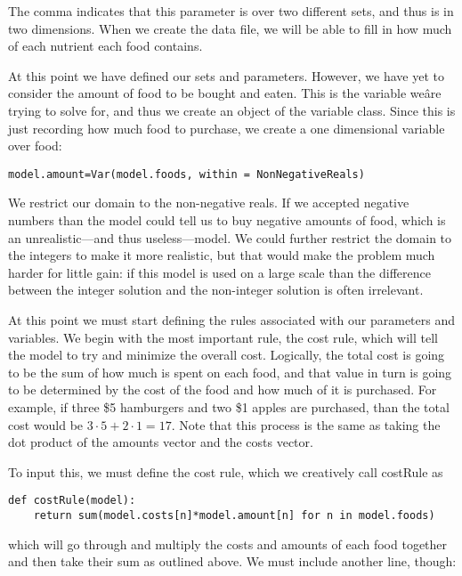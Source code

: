 \documentclass{article}
\begin{document}
The comma indicates that this parameter is over two different sets, and thus is in two dimensions.  When we create the data file, we will be able to fill in how much of each nutrient each food contains.

At this point we have defined our sets and parameters.  However, we have yet to consider the amount of food to be bought and eaten.  This is the variable weâre trying to solve for, and thus we create an object of the variable class.  Since this is just recording how much food to purchase, we create a one dimensional variable over food:

\begin{verbatim}model.amount=Var(model.foods, within = NonNegativeReals) \end{verbatim}

We restrict our domain to the non-negative reals.  If we accepted negative numbers than the model could tell us to buy negative amounts of food, which is an unrealistic---and thus useless---model.  We could further restrict the domain to the integers to make it more realistic, but that would make the problem much harder for little gain: if this model is used on a large scale than the difference between the integer solution and the non-integer solution is often irrelevant.

At this point we must start defining the rules associated with our parameters and variables.  We begin with the most important rule, the cost rule, which will tell the model to try and minimize the overall cost.  Logically, the total cost is going to be the sum of how much is spent on each food, and that value in turn is going to be determined by the cost of the food and how much of it is purchased.  For example, if three \$5 hamburgers and two \$1 apples are purchased, than the total cost would be $3 \cdot 5 + 2 \cdot 1 = 17$.  Note that this process is the same as taking the dot product of the amounts vector and the costs vector.

To input this, we must define the cost rule, which we creatively call costRule as 

\begin{verbatim}def costRule(model):
    return sum(model.costs[n]*model.amount[n] for n in model.foods)
\end{verbatim}

\noindent
which will go through and multiply the costs and amounts of each food together and then take their sum as outlined above.  We must include another line, though:
\end{document}
